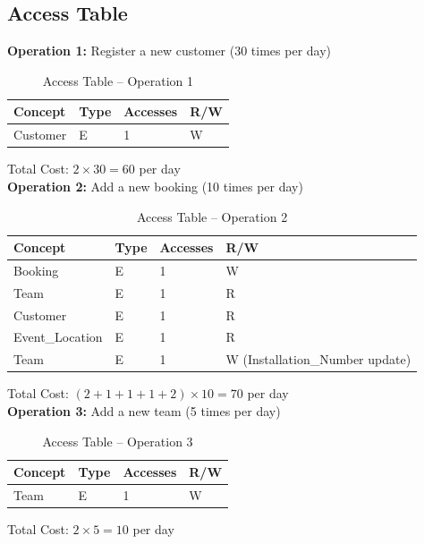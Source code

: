 \subsection{Access Table}

\noindent\textbf{Operation 1:} Register a new customer (30 times per day)
\begin{table}[H]
    \renewcommand{\arraystretch}{1.3}
    \begin{tabularx}{\textwidth}{|X|X|X|X|}
    \hline
    \textbf{Concept} & \textbf{Type} & \textbf{Accesses} & \textbf{R/W} \\ \hline
    Customer & E & 1 & W \\ \hline
    \end{tabularx}
    \caption{Access Table -- Operation 1}
\end{table}
\noindent Total Cost: $2 \times 30 = 60$ per day\\

\noindent\textbf{Operation 2:} Add a new booking (10 times per day)
\begin{table}[H]
    \renewcommand{\arraystretch}{1.3}
    \begin{tabularx}{\textwidth}{|X|X|X|X|}
    \hline
    \textbf{Concept} & \textbf{Type} & \textbf{Accesses} & \textbf{R/W} \\ \hline
    Booking         & E & 1    & W \\ \hline
    Team            & E & 1    & R \\ \hline
    Customer        & E & 1    & R \\ \hline
    Event\_Location & E & 1    & R \\ \hline
    Team            & E & 1    & W (Installation\_Number update) \\ \hline
    \end{tabularx}
    \caption{Access Table -- Operation 2}
\end{table}
\noindent Total Cost: $(2 + 1 + 1 + 1 + 2) \times 10 = 70$ per day\\

\noindent\textbf{Operation 3:} Add a new team (5 times per day)
\begin{table}[H]
    \renewcommand{\arraystretch}{1.3}
    \begin{tabularx}{\textwidth}{|X|X|X|X|}
    \hline
    \textbf{Concept} & \textbf{Type} & \textbf{Accesses} & \textbf{R/W} \\ \hline
    Team & E & 1 & W \\ \hline
    \end{tabularx}
    \caption{Access Table -- Operation 3}
\end{table}
\noindent Total Cost: $2 \times 5 = 10$ per day\\

